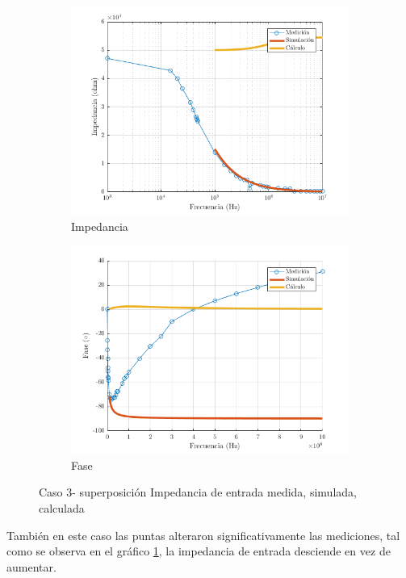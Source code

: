 \documentclass[../../main.tex]{subfiles}
\begin{document}
\begin{figure}[H]
\centering
\begin{subfigure}[http]{0.49\textwidth}
\includegraphics[width=\textwidth]{imagenes/z_inv_r_c3.png}
\caption{Impedancia}\label{fig=zInvZc3}
\end{subfigure}
\begin{subfigure}[http]{0.49\textwidth}
\includegraphics[width=\textwidth]{imagenes/z_inv_f_c3.png}
\caption{Fase} \label{fig=zInvFc3}
\end{subfigure}
\caption{Caso 3- superposición Impedancia de entrada  medida, simulada, calculada}
\end{figure}

Tambi\'en en este caso las puntas alteraron significativamente las mediciones, tal como se observa en el gr\'afico \ref{fig=zInvZc3}, la impedancia de entrada desciende en vez de aumentar.
\end{document}
